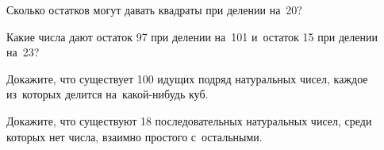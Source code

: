 \begin{problems}
\item
Сколько остатков могут давать квадраты при делении на~20?

\item
Какие числа дают остаток 97 при делении на~101 и~остаток 15 при делении на~23?

\item
Докажите, что существует 100 идущих подряд натуральных чисел, каждое из~которых
делится на~какой-нибудь куб.

\item
Докажите, что существуют 18 последовательных натуральных чисел, среди которых
нет числа, взаимно простого с~остальными.

\end{problems}

